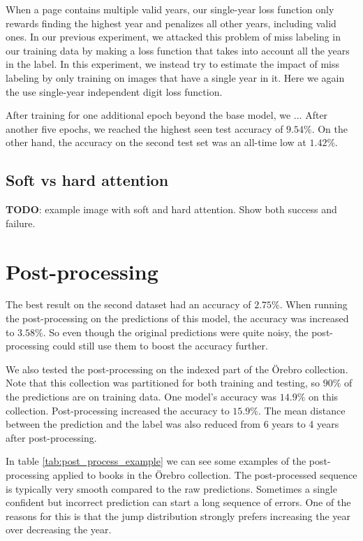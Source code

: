 When a page contains multiple valid years, our single-year loss function only rewards finding the highest year and penalizes all other years, including valid ones.
In our previous experiment, we attacked this problem of miss labeling in our training data by making a loss function that takes into account all the years in the label. In this experiment, we instead try to estimate the impact of miss labeling by only training on images that have a single year in it. Here we again the use single-year independent digit loss function.

After training for one additional epoch beyond the base model, we ...
After another five epochs, we reached the highest seen test accuracy of $9.54\%$. On the other hand, the accuracy on the second test set was an all-time low at $1.42\%$.

\subsection{Soft vs hard attention} \label{sssec:result_attention}

\textbf{TODO}: example image with soft and hard attention. Show both success and failure.

\section{Post-processing} \label{sec:result_post_process}

The best result on the second dataset had an accuracy of $2.75\%$. When running the post-processing on the predictions of this model, the accuracy was increased to $3.58\%$. So even though the original predictions were quite noisy, the post-processing could still use them to boost the accuracy further.

We also tested the post-processing on the indexed part of the Örebro collection. Note that this collection was partitioned for both training and testing, so $90\%$ of the predictions are on training data. One model's accuracy was $14.9\%$ on this collection. Post-processing increased the accuracy to $15.9\%$. The mean distance between the prediction and the label was also reduced from 6 years to 4 years after post-processing.



In table \ref{tab:post_process_example} we can see some examples of the post-processing applied to books in the Örebro collection. The post-processed sequence is typically very smooth compared to the raw predictions. Sometimes a single confident but incorrect prediction can start a long sequence of errors. One of the reasons for this is that the jump distribution strongly prefers increasing the year over decreasing the year.

